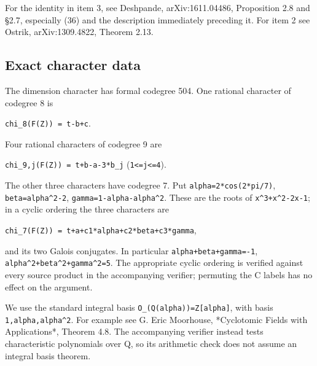 For the identity in item 3, see Deshpande, arXiv:1611.04486, Proposition
2.8 and §2.7, especially (36) and the description immediately preceding
it. For item 2 see Ostrik, arXiv:1309.4822, Theorem 2.13.

\hypertarget{exact-character-data}{%
\subsection{Exact character data}\label{exact-character-data}}

The dimension character has formal codegree 504. One rational character
of codegree 8 is

\texttt{chi\_\allowbreak{}8(F(Z)\allowbreak{}) = t-\allowbreak{}b+c}.

Four rational characters of codegree 9 are

\texttt{chi\_\allowbreak{}9,j(F(\allowbreak{}Z)) = \allowbreak{}t+b-\allowbreak{}a-\allowbreak{}3*b\_\allowbreak{}j}
(\texttt{1<=j<=\allowbreak{}4}).

The other three characters have codegree 7. Put
\texttt{alpha=\allowbreak{}2*cos(\allowbreak{}2*pi/\allowbreak{}7)},
\texttt{beta=a\allowbreak{}lpha\textasciicircum{}2\allowbreak{}-\allowbreak{}2},
\texttt{gamma=\allowbreak{}1-\allowbreak{}alpha-\allowbreak{}alpha\textasciicircum{}\allowbreak{}2}.
These are the roots of
\texttt{x\textasciicircum{}3+x\textasciicircum{}\allowbreak{}2-\allowbreak{}2x-\allowbreak{}1};
in a cyclic ordering the three characters are

\texttt{chi\_\allowbreak{}7(F(Z)\allowbreak{}) = t+\allowbreak{}a+c1*a\allowbreak{}lpha+c\allowbreak{}2*beta\allowbreak{}+c3*ga\allowbreak{}mma},

and its two Galois conjugates. In particular
\texttt{alpha+\allowbreak{}beta+g\allowbreak{}amma=-\allowbreak{}1},
\texttt{alpha\textasciicircum{}\allowbreak{}2+beta\allowbreak{}\textasciicircum{}2+gam\allowbreak{}ma\textasciicircum{}2=5\allowbreak{}}.
The appropriate cyclic ordering is verified against every source product
in the accompanying verifier; permuting the C labels has no effect on
the argument.

We use the standard integral basis
\texttt{O\_\allowbreak{}(Q(alp\allowbreak{}ha))=Z\allowbreak{}[alpha\allowbreak{}]},
with basis
\texttt{1,alph\allowbreak{}a,alph\allowbreak{}a\textasciicircum{}2}. For
example see G. Eric Moorhouse, *Cyclotomic Fields with Applications*,
Theorem 4.8. The accompanying verifier instead tests characteristic
polynomials over Q, so its arithmetic check does not assume an integral
basis theorem.

